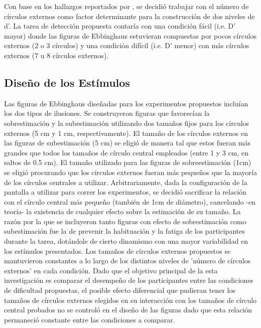 Con base en los hallazgos reportados por \parencite{Massaro1971}, se decidió trabajar con el número de círculos externos como factor determinante para la construcción de dos niveles de d'. La tarea de detección propuesta contaría con una condición fácil (i.e. D' mayor) donde las figuras de Ebbinghaus estuvieran compuestas por pocos círculos externos (2 o 3 círculos) y una condición difícil (i.e. D' menor) con más círculos externos (7 u 8 círculos externos).\\ 

\subsection{Diseño de los Estímulos}

Las figuras de Ebbinghaus diseñadas para los experimentos propuestos incluían los dos tipos de ilusiones. Se construyeron figuras que favorecían la sobrestimación y la subestimación utilizando dos tamaños fijos para los círculos externos (5 cm y 1 cm, respectivamente). El tamaño de los círculos externos en las figuras de subestimación (5 cm) se eligió de manera tal que estos fueran más grandes que todos los tamaños de círculo central empleados (entre 1 y 3 cm, en saltos de 0.5 cm). El tamaño utilizado para las figuras de sobreestimación (1cm) se eligió procurando que los circulos externos fueran más pequeños que la mayoría de los círculos centrales a utilizar. Arbitrariamente, dada la configuración de la pantalla a utilizar para correr los experimentos, se decidió sacrificar la relación con el círculo central más pequeño (también de 1cm de diámetro), cancelando -en teoría- la existencia de cualquier efecto sobre la estimación de su tamaño. La razón por la que se incluyeron tanto figuras con efecto de sobrestimación como subestimación fue la de prevenir la habituación y la fatiga de los participantes durante la tarea, dotándole de cierto dinamismo con una mayor variabilidad en los estímulos presentados. Los tamaños de círculos externos propuestos se mantuvieron constantes a lo largo de los distintos niveles de 'número de círculos externos' en cada condición. Dado que el objetivo principal de la esta investigación es comparar el desempeño de los participantes entre las condiciones de dificultad propuestas, el posible efecto diferencial que pudieran tener los tamaños de círculos externos elegidos en su interacción con los tamaños de círculo central probados no se controló en el diseño de las figuras dado que esta relación permaneció constante entre las condiciones a comparar.\\

